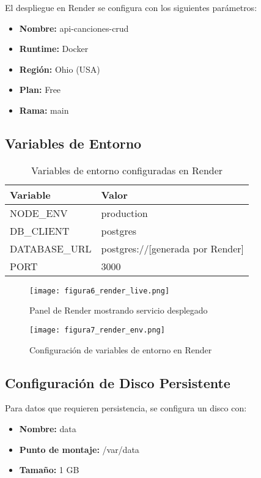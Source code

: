 \documentclass[12pt,a4paper]{article}
\begin{document}
El despliegue en Render se configura con los siguientes parámetros:

\begin{itemize}
    \item \textbf{Nombre:} api-canciones-crud
    \item \textbf{Runtime:} Docker
    \item \textbf{Región:} Ohio (USA)
    \item \textbf{Plan:} Free
    \item \textbf{Rama:} main
\end{itemize}

\subsection{Variables de Entorno}

\begin{table}[H]
\centering
\caption{Variables de entorno configuradas en Render}
\begin{tabular}{@{}ll@{}}
\toprule
\textbf{Variable} & \textbf{Valor} \\
\midrule
NODE\_ENV & production \\
DB\_CLIENT & postgres \\
DATABASE\_URL & postgres://[generada por Render] \\
PORT & 3000 \\
\bottomrule
\end{tabular}
\end{table}

\begin{figure}[H]
\centering
\texttt{[image: figura6\_render\_live.png]}
\caption{Panel de Render mostrando servicio desplegado}
\end{figure}

\begin{figure}[H]
\centering
\texttt{[image: figura7\_render\_env.png]}
\caption{Configuración de variables de entorno en Render}
\end{figure}

\subsection{Configuración de Disco Persistente}

Para datos que requieren persistencia, se configura un disco con:

\begin{itemize}
    \item \textbf{Nombre:} data
    \item \textbf{Punto de montaje:} /var/data
    \item \textbf{Tamaño:} 1 GB
\end{itemize}
\end{document}
